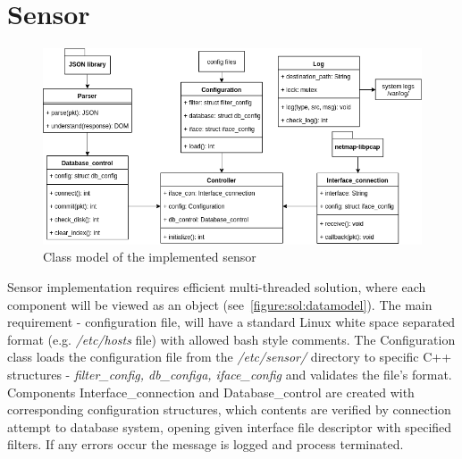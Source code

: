 \documentclass[12pt,a4paper,twoside]{report}
\begin{document}
	\section{Sensor} \label{implementation:sensor}
		\begin{figure}
			\centering
			\includegraphics[scale=0.57]{datamodel}
			\caption{Class model of the implemented sensor}
			\label{figure:sol:datamodel}
		\end{figure}
		Sensor implementation requires efficient multi-threaded solution, where each component will be viewed as an object (see~\autoref{figure:sol:datamodel}). The main requirement - configuration file, will have a standard Linux white space separated format (e.g. \emph{/etc/hosts} file) with allowed bash style comments. The Configuration class loads the configuration file from the \emph{/etc/sensor/} directory to specific C++ structures - \emph{filter\_config, db\_configa, iface\_config} and validates the file's format. Components Interface\_connection and Database\_control are created with corresponding configuration structures, which contents are verified by connection attempt to database system, opening given interface file descriptor with specified filters. If any errors occur the message is logged and process terminated.
\end{document}
